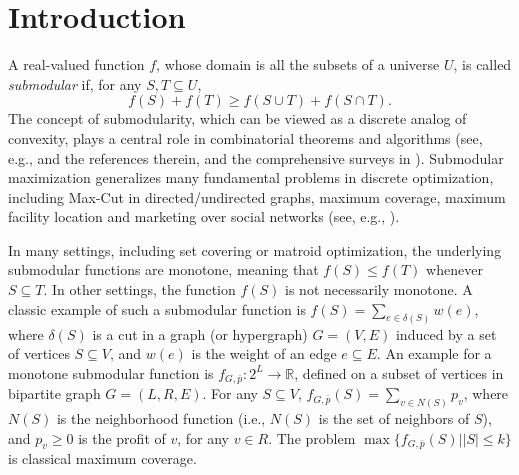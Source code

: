 \documentclass[11pt]{article}
\newcommand{\abs}[1]{ \left| #1 \right |}
\begin{document}
\section{Introduction} \label{sec:intro}


 A real-valued function $f$, whose domain is all the
 subsets of a universe $U$, is called {\em submodular} if,
 for any $S,T \subseteq U$,
\[
 f(S) + f(T) \geq f(S \cup T) + f(S \cap T).
 \]
The concept of submodularity, which can be viewed as a discrete analog of convexity,
plays a central role in combinatorial theorems and algorithms
(see, e.g., \cite{f99}
and the references therein, and the comprehensive
surveys in \cite{FMV07,Vo08,LMNS09}).
Submodular maximization generalizes many fundamental problems in
discrete optimization, including Max-Cut in directed/undirected
graphs, maximum coverage, maximum facility location and marketing
over social networks (see, e.g., \cite{HMS08}).

In many settings, including set covering or matroid optimization, the
underlying submodular functions are monotone, meaning that $f(S)
\leq f(T)$ whenever $S \subseteq T$. In other settings, the function $f(S)$
is not necessarily monotone.
A classic
example of such a submodular function is $f(S)= \sum_{e \in \delta(S)} w(e)$,
where $\delta(S)$ is a cut in a graph (or hypergraph) $G=(V,E)$
induced by a set of vertices $S \subseteq V$, and $w(e)$ is the weight of an edge $e \subseteq E$.
An example for a monotone submodular function is $f_{G,\bar{p}}:2^L \rightarrow \mathbb{R}$, defined on a subset of vertices in bipartite graph
$G=(L,R,E)$. For any $S \subseteq V$, $f_{G,\bar{p}}(S)= \sum_{v \in N(S)} p_v$, where $N(S)$ is the neighborhood function (i.e., $N(S)$ is the
set of neighbors of $S$), and $p_v \geq 0$ is the profit of $v$, for any $v \in R$.
The problem
$\max\{f_{G,\bar{p}}(S) | \abs{S} \leq k\}$ is classical maximum coverage.
\end{document}

